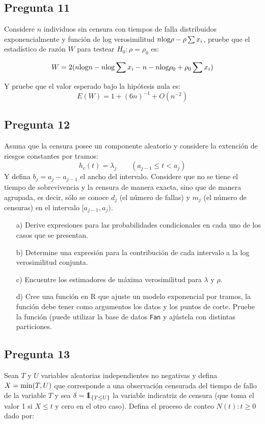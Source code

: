 \documentclass[10pt]{article}\usepackage[]{graphicx}\usepackage[]{color}
\def\one{\mbox{1\hspace{-4.25pt}\fontsize{12}{14.4}\selectfont\textrm{1}}}
\begin{document}
\subsection*{Pregunta 11} 
Considere $n$ individuos sin censura con tiempos de falla distribuidos exponencialmente y función de log verosimilitud $n \textnormal{log} \rho -\rho \sum{x_{i}}$, pruebe que el estadístico de razón $W$ para testear $H_{0}: \rho=\rho_{0}$ es:

$$W=2(n \textnormal{log} n-n \textnormal{log}\sum{x_{i}}-n-n \textnormal{log} \rho_{0} +\rho_{0}\sum{x_{i}})$$

Y pruebe que el valor esperado bajo la hipótesis nula es:
$$E(W)= 1+(6n)^{-1}+O(n^{-2})$$

\subsection*{Pregunta 12}  
Asuma que la censura posee un componente aleatorio y considere la extención de riesgos constantes por tramos:
$$h_{c}(t)=\lambda_{j} \qquad (a_{j-1}\leq t <a_{j})$$
Y defina $b_{j}=a_{j}-a_{j-1}$ el ancho del intervalo. Considere que no se tiene el tiempo de sobrevivencia y la censura de manera exacta, sino que de manera agrupada, es decir, sólo se conoce $d_{j}$ (el número de fallas) y $m_{j}$ (el número de censuras) en el intervalo $[a_{j-1},a_{j})$.
\begin{itemize}
\item[a)] Derive expresiones para las probabilidades condicionales en cada uno de los casos que se presentan.
\item[b)] Determine una expresión para la contribución de cada intervalo a la log verosimilitud conjunta.
\item[c)] Encuentre los estimadores de máxima verosimilitud para $\lambda$ y $\rho$.
\item[d)] Cree una función en R que ajuste un modelo exponencial por tramos, la función debe tener como argumentos los datos y los puntos de corte. Pruebe la función (puede utilizar la base de datos \texttt{Fan} y ajústela con distintas particiones.
\end{itemize}

\subsection*{Pregunta 13} 
Sean $T$ y $U$ variables aleatorias independientes no negativas y defina $X=\textnormal{min}(T,U)$ que corresponde a una observación censurada del tiempo de fallo de la variable $T$ y sea $\delta=\one_{\{T\leq U\}}$ la variable indicatriz de censura (que toma el valor 1 si $X \leq t$ y cero en el otro caso). Defina el proceso de conteo $N(t): t \geq 0$ dado por:
\end{document}
